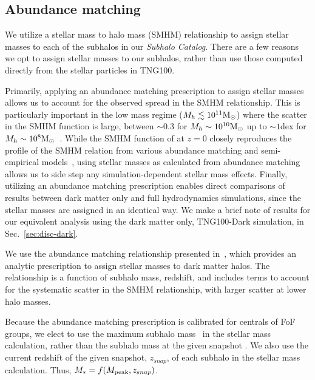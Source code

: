 \documentclass[twocolumn]{aastex631}
\newcommand{\ms}[1]{\ensuremath{M_{*{#1}}}}
\newcommand{\subcat}{\textit{Subhalo Catalog}}
\begin{document}
    \subsection{Abundance matching} \label{sec:methods-am}
    We utilize a stellar mass to halo mass (SMHM) relationship to assign stellar masses to each of the subhalos in our \subcat.  
    There are a few reasons we opt to assign stellar masses to our subhalos, rather than use those computed directly from the stellar particles in TNG100.

    Primarily, applying an abundance matching prescription to assign stellar masses allows us to account for the observed spread in the SMHM relationship. 
    This is particularly important in the low mass regime ($M_h \lesssim 10^{11}\mathrm{M}_\odot$) where the scatter in the SMHM function is large, between $\sim 0.3$ for $M_{h}\sim 10^{10}\mathrm{M}_\odot$ up to $\sim 1$dex for $M_{h}\sim10^{8}\mathrm{M}_\odot$~\citep{Munshi2021}. 
    While the SMHM function of \tng{} at $z=0$ closely reproduces the profile of the SMHM relation from various abundance matching and semi-empirical models~\citep{TNG5}, using stellar masses as calculated from abundance matching allows us to side step any simulation-dependent stellar mass effects. 
    Finally, utilizing an abundance matching prescription enables direct comparisons of results between dark matter only and full hydrodynamics simulations, since the stellar masses are assigned in an identical way. 
    We make a brief note of results for our equivalent analysis using the dark matter only, TNG100-Dark simulation, in Sec.~\ref{sec:disc-dark}.
    
    We use the abundance matching relationship presented in~\citet{Moster2013}, which provides an analytic prescription to assign stellar masses to dark matter halos. 
    The~\citet{Moster2013} relationship is a function of subhalo mass, redshift, and includes terms to account for the systematic scatter in the SMHM relationship, with larger scatter at lower halo masses.
    
    Because the abundance matching prescription is calibrated for centrals of FoF groups, we elect to use the maximum subhalo mass \Mpeak\ in the stellar mass calculation, rather than the subhalo mass at the given snapshot \citep[see][]{Besla2018}.
    We also use the current redshift of the given snapshot, $z_{snap}$, of each subhalo in the stellar mass calculation. 
    Thus, $\ms{}=f(\Mpeak,z_{snap})$. 
    
\end{document}
